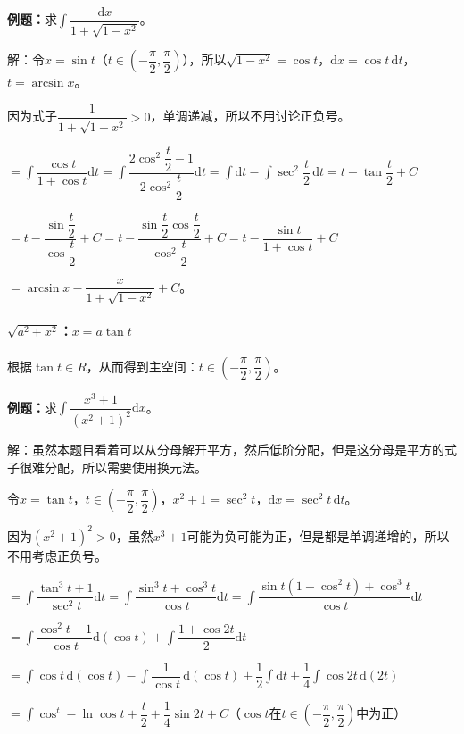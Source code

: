 \documentclass[UTF8, 12pt]{ctexart}
\begin{document}
\textbf{例题：}求$\displaystyle{\int\dfrac{\textrm{d}x}{1+\sqrt{1-x^2}}}$。\medskip

解：令$x=\sin t$（$t\in\left(-\dfrac{\pi}{2},\dfrac{\pi}{2}\right)$），所以$\sqrt{1-x^2}=\cos t$，$\textrm{d}x=\cos t\,\textrm{d}t$，$t=\arcsin x$。

因为式子$\dfrac{1}{1+\sqrt{1-x^2}}>0$，单调递减，所以不用讨论正负号。

$=\displaystyle{\int\dfrac{\cos t}{1+\cos t}\textrm{d}t=\int\dfrac{2\cos^2\dfrac{t}{2}-1}{2\cos^2\dfrac{t}{2}}\textrm{d}t=\int\textrm{d}t-\int\sec^2\dfrac{t}{2}\,\textrm{d}t=t-\tan}\dfrac{t}{2}+C$

$=t-\dfrac{\sin\dfrac{t}{2}}{\cos\dfrac{t}{2}}+C=t-\dfrac{\sin\dfrac{t}{2}\cos\dfrac{t}{2}}{\cos^2\dfrac{t}{2}}+C=t-\dfrac{\sin t}{1+\cos t}+C$

$=\arcsin x-\dfrac{x}{1+\sqrt{1-x^2}}+C$。

\paragraph{\texorpdfstring{$\sqrt{a^2+x^2}$：$x=a\tan t$}\ } \leavevmode \medskip

根据$\tan t\in R$，从而得到主空间：$t\in\left(-\dfrac{\pi}{2},\dfrac{\pi}{2}\right)$。

\textbf{例题：}求$\displaystyle{\int\dfrac{x^3+1}{(x^2+1)^2}\textrm{d}x}$。\medskip

解：虽然本题目看着可以从分母解开平方，然后低阶分配，但是这分母是平方的式子很难分配，所以需要使用换元法。

令$x=\tan t$，$t\in\left(-\dfrac{\pi}{2},\dfrac{\pi}{2}\right)$，$x^2+1=\sec^2t$，$\textrm{d}x=\sec^2t\,\textrm{d}t$。

因为$(x^2+1)^2>0$，虽然$x^3+1$可能为负可能为正，但是都是单调递增的，所以不用考虑正负号。

$=\displaystyle{\int\dfrac{\tan^3t+1}{\sec^2t}\textrm{d}t=\int\dfrac{\sin^3t+\cos^3t}{\cos t}\textrm{d}t=\int\dfrac{\sin t(1-\cos^2t)+\cos^3t}{\cos t}\textrm{d}t}$

$=\displaystyle{\int\dfrac{\cos^2t-1}{\cos t}\textrm{d}(\cos t)+\int\dfrac{1+\cos2t}{2}\textrm{d}t}$

$=\displaystyle{\int\cos t\,\textrm{d}(\cos t)-\int\dfrac{1}{\cos t}\,\textrm{d}(\cos t)+\dfrac{1}{2}\int\textrm{d}t+\dfrac{1}{4}\int\cos2t\,\textrm{d}(2t)}$

$=\displaystyle{\int\cos^t-\ln\cos t+\dfrac{t}{2}+\dfrac{1}{4}\sin2t+C}$（$\cos t$在$t\in\left(-\dfrac{\pi}{2},\dfrac{\pi}{2}\right)$中为正）
\end{document}
